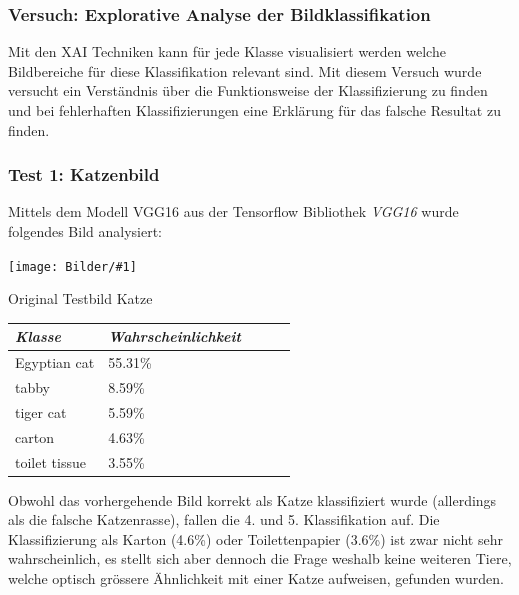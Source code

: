 \documentclass[
  12pt, %
  a4paper, %
  oneside, %
  openany, 
  numbers=noenddot, %
  BCOR=5mm, %
  parskip=half*, %
  thesis, %
]{bfhbook}
\newcommand{\imgText}[3]{
\begin{center}
    \begin{minipage}[t]{0.6\textwidth}
    		\vspace{0pt}
		\texttt{[image: Bilder/\#1]}
		\caption{#2}
	\end{minipage}\hfill
    \begin{minipage}[t]{0.4\textwidth}
    		\vspace{5pt}
  		#3
    \end{minipage}
\end{center}
}
\begin{document}
\subsubsection*{Versuch: Explorative Analyse der Bildklassifikation}
Mit den \gls{XAI} Techniken kann für jede Klasse visualisiert werden welche Bildbereiche für diese Klassifikation relevant sind. Mit diesem Versuch wurde versucht ein Verständnis über die Funktionsweise der Klassifizierung zu finden und bei fehlerhaften Klassifizierungen eine Erklärung für das falsche Resultat zu finden.

\subsubsection*{Test 1: Katzenbild}
Mittels dem Modell VGG16 aus der Tensorflow Bibliothek \textit{VGG16} \cite{vgg16} wurde folgendes Bild analysiert:
\imgText{Mira.jpg}{Original Testbild Katze}{
		
		\begin{tabular}{@{} *5l @{}}    \toprule
		\emph{Klasse} & \emph{Wahrscheinlichkeit} &&&  \\\midrule
		Egyptian cat & 55.31\% \\ 
		 tabby & 8.59\% \\ 
		 tiger cat & 5.59\% \\ 
		 carton & 4.63\% \\
		 toilet tissue & 3.55\% \\ \bottomrule
		 \hline
		\end{tabular}
}

Obwohl das vorhergehende Bild korrekt als Katze klassifiziert wurde (allerdings als die falsche Katzenrasse), fallen die 4. und 5. Klassifikation auf. Die Klassifizierung als Karton (4.6\%) oder Toilettenpapier (3.6\%) ist zwar nicht sehr wahrscheinlich, es stellt sich aber dennoch die Frage weshalb keine weiteren Tiere, welche optisch grössere Ähnlichkeit mit einer Katze aufweisen, gefunden wurden.
\end{document}
